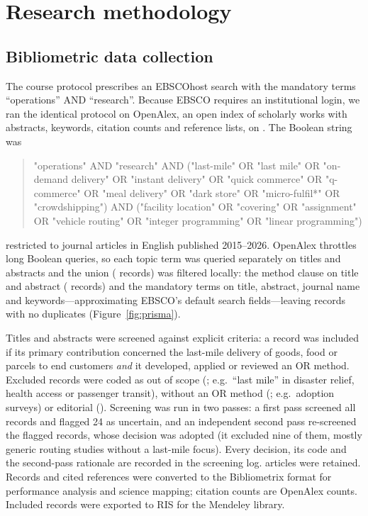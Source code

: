 \section{Research methodology}\label{sec:method}

\subsection{Bibliometric data collection}

The course protocol prescribes an EBSCOhost search with the mandatory terms ``operations'' AND ``research''. Because EBSCO requires an institutional login, we ran the identical protocol on OpenAlex, an open index of scholarly works with abstracts, keywords, citation counts and reference lists, on \BibSearchDate. The Boolean string was
\begin{quote}\footnotesize\ttfamily\raggedright
"operations" AND "research" AND ("last-mile" OR "last mile" OR "on-demand delivery" OR "instant delivery" OR "quick commerce" OR "q-commerce" OR "meal delivery" OR "dark store" OR "micro-fulfil*" OR "crowdshipping") AND ("facility location" OR "covering" OR "assignment" OR "vehicle routing" OR "integer programming" OR "linear programming")
\end{quote}
restricted to journal articles in English published 2015--2026. OpenAlex throttles long Boolean queries, so each topic term was queried separately on titles and abstracts and the union (\BibIdentified{} records) was filtered locally: the method clause on title and abstract (\BibAfterMethod{} records) and the mandatory terms on title, abstract, journal name and keywords---approximating EBSCO's default search fields---leaving \BibScreened{} records with no duplicates (Figure~\ref{fig:prisma}).

Titles and abstracts were screened against explicit criteria: a record was included if its primary contribution concerned the last-mile delivery of goods, food or parcels to end customers \emph{and} it developed, applied or reviewed an OR method. Excluded records were coded as out of scope (\BibExclScope; e.g.\ ``last mile'' in disaster relief, health access or passenger transit), without an OR method (\BibExclNoOR; e.g.\ adoption surveys) or editorial (\BibExclIntro). Screening was run in two passes: a first pass screened all records and flagged 24 as uncertain, and an independent second pass re-screened the flagged records, whose decision was adopted (it excluded nine of them, mostly generic routing studies without a last-mile focus). Every decision, its code and the second-pass rationale are recorded in the screening log. \BibIncluded{} articles were retained. Records and cited references were converted to the Bibliometrix format \citep{aria2017bibliometrix} for performance analysis and science mapping; citation counts are OpenAlex counts. Included records were exported to RIS for the Mendeley library.

